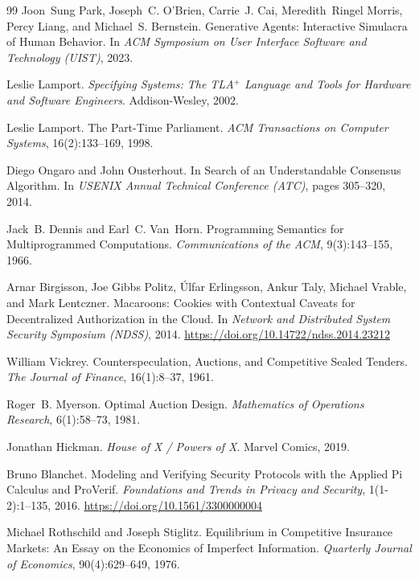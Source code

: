 \documentclass[11pt,a4paper]{article}
\theoremstyle{definition}
\theoremstyle{remark}
\begin{document}
\begin{thebibliography}{99}
Joon~Sung Park, Joseph~C. O'Brien, Carrie~J. Cai, Meredith~Ringel Morris, Percy Liang, and Michael~S. Bernstein.
\newblock Generative Agents: Interactive Simulacra of Human Behavior.
\newblock In \textit{ACM Symposium on User Interface Software and Technology (UIST)}, 2023.

Leslie Lamport.
\newblock \textit{Specifying Systems: The TLA$^{+}$ Language and Tools for Hardware and Software Engineers}.
\newblock Addison-Wesley, 2002.

Leslie Lamport.
\newblock The Part-Time Parliament.
\newblock \textit{ACM Transactions on Computer Systems}, 16(2):133--169, 1998.

Diego Ongaro and John Ousterhout.
\newblock In Search of an Understandable Consensus Algorithm.
\newblock In \textit{USENIX Annual Technical Conference (ATC)}, pages 305--320, 2014.

Jack~B. Dennis and Earl~C. Van~Horn.
\newblock Programming Semantics for Multiprogrammed Computations.
\newblock \textit{Communications of the ACM}, 9(3):143--155, 1966.

Arnar Birgisson, Joe Gibbs Politz, Úlfar Erlingsson, Ankur Taly, Michael Vrable, and Mark Lentczner.
\newblock Macaroons: Cookies with Contextual Caveats for Decentralized Authorization in the Cloud.
\newblock In \textit{Network and Distributed System Security Symposium (NDSS)}, 2014.
\newblock \url{https://doi.org/10.14722/ndss.2014.23212}

William Vickrey.
\newblock Counterspeculation, Auctions, and Competitive Sealed Tenders.
\newblock \textit{The Journal of Finance}, 16(1):8--37, 1961.

Roger~B. Myerson.
\newblock Optimal Auction Design.
\newblock \textit{Mathematics of Operations Research}, 6(1):58--73, 1981.

Jonathan Hickman.
\newblock \textit{House of X / Powers of X}.
\newblock Marvel Comics, 2019.

Bruno Blanchet.
\newblock Modeling and Verifying Security Protocols with the Applied Pi Calculus and ProVerif.
\newblock \textit{Foundations and Trends in Privacy and Security}, 1(1-2):1--135, 2016.
\newblock \url{https://doi.org/10.1561/3300000004}

Michael Rothschild and Joseph Stiglitz.
\newblock Equilibrium in Competitive Insurance Markets: An Essay on the Economics of Imperfect Information.
\newblock \textit{Quarterly Journal of Economics}, 90(4):629--649, 1976.


\end{thebibliography}
\end{document}
